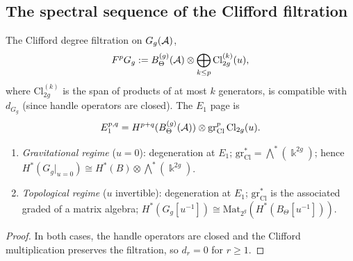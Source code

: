 %
%

\subsection{The spectral sequence of the Clifford filtration}
\label{subsec:clifford-spectral}

\begin{construction}
\label{constr:clifford-spectral}
The Clifford degree filtration on $G_g(\mathcal{A})$,
\begin{equation}\label{eq:g9-clifford-filtration}
F^p G_g := B_\Theta^{(g)}(\mathcal{A}) \otimes
\bigoplus_{k \leq p} \mathrm{Cl}_{2g}^{(k)}(u),
\end{equation}
where $\mathrm{Cl}_{2g}^{(k)}$ is the span of products of at most $k$
generators, is compatible with $d_{G_g}$ (since handle operators are
closed). The $E_1$ page is
\begin{equation}\label{eq:g9-clifford-E1}
E_1^{p,q} = H^{p+q}(B_\Theta^{(g)}(\mathcal{A}))
\otimes \mathrm{gr}^p_{\mathrm{Cl}}\,\mathrm{Cl}_{2g}(u).
\end{equation}
\end{construction}

\begin{proposition}
\label{prop:clifford-spectral-degeneration}
\begin{enumerate}[label=\textup{(\roman*)}]
\item \emph{Gravitational regime} ($u = 0$): degeneration at $E_1$;
$\mathrm{gr}_{\mathrm{Cl}}^* = \bigwedge^*(\Bbbk^{2g})$; hence
$H^*(G_g|_{u=0}) \cong H^*(B) \otimes \bigwedge^*(\Bbbk^{2g})$.

\item \emph{Topological regime} ($u$ invertible): degeneration at
$E_1$; $\mathrm{gr}_{\mathrm{Cl}}^*$ is the associated graded of a
matrix algebra; $H^*(G_g[u^{-1}]) \cong
\mathrm{Mat}_{2^g}(H^*(B_\Theta[u^{-1}]))$.
\end{enumerate}
\end{proposition}

\begin{proof}
In both cases, the handle operators are closed and the Clifford
multiplication preserves the filtration, so $d_r = 0$ for $r \geq 1$.
\end{proof}


